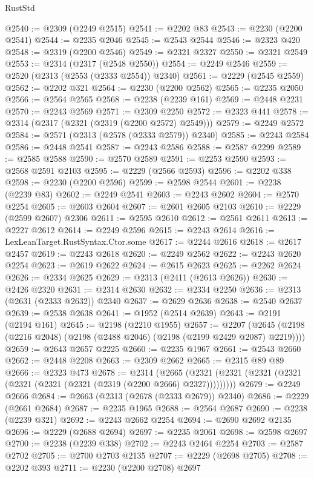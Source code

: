 \begin{lexlean}{RustStd}
\begin{coremodule}
{\begin{coremodule}
{{{{{{{{{{{{{{{{{{{{{{{{{{{{{{{{{{@2540 := @2309 (@2249 @2515)
@2541 := @2202 @83
@2543 := @2230 (@2200 @2541)
@2544 := @2235 @2046
@2545 := @2543 @2544
@2546 := @2323 @420
@2548 := @2319 (@2200 @2546)
@2549 := @2321 @2327
@2550 := @2321 @2549
@2553 := @2314 (@2317 (@2548 @2550))
@2554 := @2249 @2546
@2559 := @2520 (@2313 (@2553 (@2333 @2554)) @2340)
@2561 := @2229 (@2545 @2559)
@2562 := @2202 @321
@2564 := @2230 (@2200 @2562)
@2565 := @2235 @2050
@2566 := @2564 @2565
@2568 := @2238 (@2239 @161)
@2569 := @2448 @2231
@2570 := @2243 @2569
@2571 := @2309 @2250
@2572 := @2323 @441
@2578 := @2314 (@2317 (@2321 (@2319 (@2200 @2572) @2549)))
@2579 := @2249 @2572
@2584 := @2571 (@2313 (@2578 (@2333 @2579)) @2340)
@2585 := @2243 @2584
@2586 := @2448 @2541
@2587 := @2243 @2586
@2588 := @2587 @2299
@2589 := @2585 @2588
@2590 := @2570 @2589
@2591 := @2253 @2590
@2593 := @2568 @2591 @2103
@2595 := @2229 (@2566 @2593)
@2596 := @2202 @338
@2598 := @2230 (@2200 @2596)
@2599 := @2598 @2544
@2601 := @2238 (@2239 @83)
@2602 := @2249 @2541
@2603 := @2243 @2602
@2604 := @2570 @2254
@2605 := @2603 @2604
@2607 := @2601 @2605 @2103
@2610 := @2229 (@2599 @2607) @2306
@2611 := @2595 @2610
@2612 := @2561 @2611
@2613 := @2227 @2612
@2614 := @2249 @2596
@2615 := @2243 @2614
@2616 := LexLeanTarget.RustSyntax.Ctor.some
@2617 := @2244 @2616
@2618 := @2617 @2457
@2619 := @2243 @2618
@2620 := @2249 @2562
@2622 := @2243 @2620 @2254
@2623 := @2619 @2622
@2624 := @2615 @2623
@2625 := @2262 @2624
@2626 := @2334 @2625
@2629 := @2313 (@2411 (@2613 @2626))
@2630 := @2426 @2320
@2631 := @2314 @2630
@2632 := @2334 @2250
@2636 := @2313 (@2631 (@2333 @2632)) @2340
@2637 := @2629 @2636
@2638 := @2540 @2637
@2639 := @2538 @2638
@2641 := @1952 (@2514 @2639)
@2643 := @2191 (@2194 @161)
@2645 := @2198 (@2210 @1955)
@2657 := @2207 (@2645 (@2198 (@2216 @2048) (@2198 (@2488 @2046) (@2198 (@2199 @2429 @2087) @2219))))
@2659 := @2643 @2657 @2225
@2660 := @2235 @1967
@2661 := @2543 @2660
@2662 := @2448 @2208
@2663 := @2309 @2662
@2665 := @2315 @89 @89
@2666 := @2323 @473
@2678 := @2314
    (@2665 (@2321 (@2321 (@2321 (@2321 (@2321 (@2321 (@2321 (@2319 (@2200 @2666) @2327)))))))))
@2679 := @2249 @2666
@2684 := @2663 (@2313 (@2678 (@2333 @2679)) @2340)
@2686 := @2229 (@2661 @2684)
@2687 := @2235 @1965
@2688 := @2564 @2687
@2690 := @2238 (@2239 @321)
@2692 := @2243 @2662 @2254
@2694 := @2690 @2692 @2135
@2696 := @2229 (@2688 @2694)
@2697 := @2235 @2061
@2698 := @2598 @2697
@2700 := @2238 (@2239 @338)
@2702 := @2243 @2464 @2254
@2703 := @2587 @2702
@2705 := @2700 @2703 @2135
@2707 := @2229 (@2698 @2705)
@2708 := @2202 @393
@2711 := @2230 (@2200 @2708) @2697
}}}}}}}}}}}}}}}}}}}}}}}}}}}}}}}}}}
\end{coremodule}}
\end{coremodule}
\end{lexlean}
